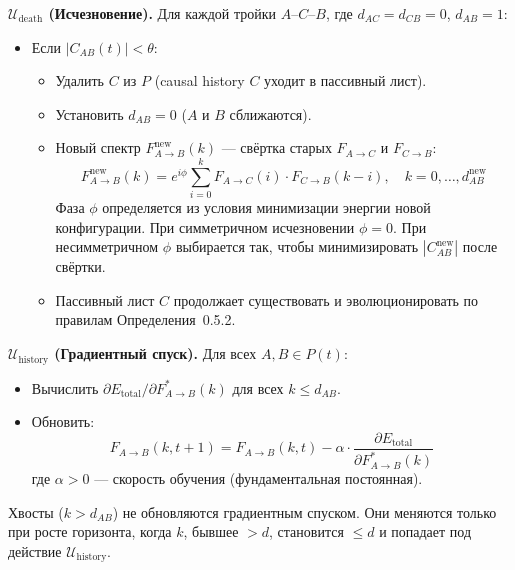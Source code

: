 \documentclass[11pt,a4paper]{article}
\theoremstyle{definition}
\begin{document}
\textbf{$\mathcal{U}_{\text{death}}$ (Исчезновение).}
Для каждой тройки $A$--$C$--$B$, где $d_{AC} = d_{CB} = 0$, $d_{AB} = 1$:
\begin{itemize}
    \item Если $|C_{AB}(t)| < \theta$:
    \begin{itemize}
        \item Удалить $C$ из $P$ (causal history $C$ уходит в пассивный лист).
        \item Установить $d_{AB} = 0$ ($A$ и $B$ сближаются).
        \item Новый спектр $F_{A \to B}^{\text{new}}(k)$ --- свёртка старых $F_{A \to C}$ и $F_{C \to B}$:
        \begin{equation}
            F_{A \to B}^{\text{new}}(k) = e^{i\phi} \sum_{i=0}^{k} F_{A \to C}(i) \cdot F_{C \to B}(k-i), \quad k = 0, \dots, d_{AB}^{\text{new}}
        \end{equation}
        Фаза $\phi$ определяется из условия минимизации энергии новой конфигурации. При симметричном исчезновении $\phi = 0$. При несимметричном $\phi$ выбирается так, чтобы минимизировать $|C_{AB}^{\text{new}}|$ после свёртки.
        \item Пассивный лист $C$ продолжает существовать и эволюционировать по правилам Определения~0.5.2.
    \end{itemize}
\end{itemize}

\textbf{$\mathcal{U}_{\text{history}}$ (Градиентный спуск).}
Для всех $A, B \in P(t)$:
\begin{itemize}
    \item Вычислить $\partial E_{\text{total}} / \partial F_{A \to B}^*(k)$ для всех $k \leq d_{AB}$.
    \item Обновить:
    \begin{equation}
        F_{A \to B}(k, t+1) = F_{A \to B}(k, t) - \alpha \cdot \frac{\partial E_{\text{total}}}{\partial F_{A \to B}^*(k)}
    \end{equation}
    где $\alpha > 0$ --- скорость обучения (фундаментальная постоянная).
\end{itemize}

Хвосты ($k > d_{AB}$) не обновляются градиентным спуском. Они меняются только при росте горизонта, когда $k$, бывшее $> d$, становится $\leq d$ и попадает под действие $\mathcal{U}_{\text{history}}$.
\end{document}
